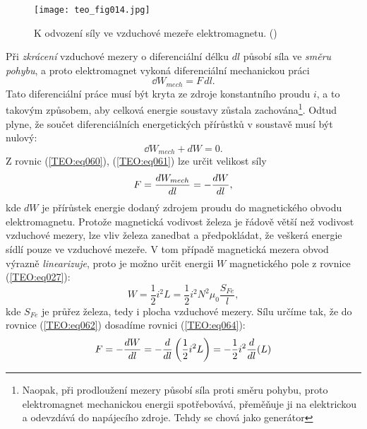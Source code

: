 {      \begin{figure}[ht!] %
        \centering
        \texttt{[image: teo\_fig014.jpg]}
        \caption{K odvození síly ve vzduchové mezeře elektromagnetu.
                 (\cite[s.~165]{Patocka4})}
        \label{teo:fig014}
      \end{figure}
      Při \emph{zkrácení} vzduchové mezery o diferenciální délku \(dl\) působí síla ve \emph{směru 
      pohybu}, a proto elektromagnet vykoná diferenciální mechanickou práci
      \begin{equation}\label{TEO:eq060}
        \dd{W_{mech}} = F\,dl.
      \end{equation}
      Tato diferenciální práce musí být kryta ze zdroje konstantního proudu \(i\), a to takovým 
      způsobem, aby celková energie soustavy zůstala zachována\footnote{Naopak, při prodloužení 
      mezery působí síla proti směru pohybu, proto elektromagnet mechanickou energii spotřebovává, 
      přeměňuje ji na elektrickou a odevzdává do napájecího zdroje. Tehdy se chová jako generátor}. 
      Odtud plyne, že součet diferenciálních energetických přírůstků v soustavě musí být nulový:
      \begin{equation}\label{TEO:eq061}
        \dd{W_{mech}} + dW = 0.
      \end{equation}
      Z rovnic (\ref{TEO:eq060}), (\ref{TEO:eq061}) lze určit velikost síly 
      \begin{equation}\label{TEO:eq062}
        F = \dfrac{d W_{mech}}{d l} = - \dfrac{d W}{d l},
      \end{equation}
      kde \(dW\) je přírůstek energie dodaný zdrojem proudu do magnetického obvodu elektromagnetu. 
      Protože magnetická vodivost železa je řádově větší než vodivost vzduchové mezery, lze vliv 
      železa zanedbat a předpokládat, že veškerá energie sídlí pouze ve vzduchové mezeře. V tom 
      případě magnetická mezera obvod výrazně \emph{linearizuje}, proto je možno určit energii 
      \(W\) magnetického pole z rovnice (\ref{TEO:eq027}): 
      \begin{equation}\label{TEO:eq064}
        W = \frac{1}{2}i^2L = \frac{1}{2}i^2N^2\mu_0\frac{S_{Fe}}{l},
      \end{equation}
      kde \(S_{Fe}\) je průřez železa, tedy i plocha vzduchové mezery. Sílu určíme tak, že do 
      rovnice (\ref{TEO:eq062}) dosadíme rovnici (\ref{TEO:eq064}):
      \begin{align}
        F = - \der{W}{l} 
         &= -\der{ }{l}\left(\frac{1}{2}i^2L\right)= -\frac{1}{2}i^2\der{ }{l}(L) \nonumber \\

\end{align}}

